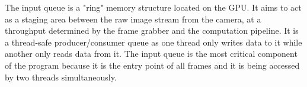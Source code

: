 The input queue is a "ring" memory structure located on the GPU. It aims to act as a staging area between the raw image stream from the camera, at a throughput determined by the frame grabber and the computation pipeline. It is a thread-safe producer/consumer queue as one thread only writes data to it while another only reads data from it. The input queue is the most critical component of the program because it is the entry point of all frames and it is being accessed by two threads simultaneously. %
